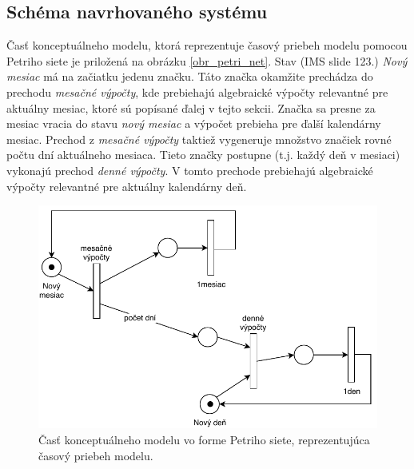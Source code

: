 \documentclass[a4paper, 11pt]{article}
\begin{document}
\subsection{Schéma navrhovaného systému} \label{petri_net_section}
Časť konceptuálneho modelu, ktorá reprezentuje časový priebeh modelu pomocou Petriho siete je priložená na obrázku \ref{obr_petri_net}. Stav (IMS\cite{ims_slides} slide 123.) \textit{Nový mesiac} má na začiatku jedenu značku. Táto značka okamžite prechádza do prechodu \textit{mesačné výpočty}, kde prebiehajú algebraické výpočty relevantné pre aktuálny mesiac, ktoré sú popísané ďalej v tejto sekcii. Značka sa presne za mesiac vracia do stavu \textit{nový mesiac} a výpočet prebieha pre ďalší kalendárny mesiac. Prechod z \textit{mesačné výpočty} taktiež vygeneruje množstvo značiek rovné počtu dní aktuálneho mesiaca. Tieto značky postupne (t.j. každý deň v mesiaci) vykonajú prechod \textit{denné výpočty}. V tomto prechode prebiehajú algebraické výpočty relevantné pre aktuálny kalendárny deň.

\begin{figure}[H] 
	\centering
	\includegraphics[width=.6\paperwidth]{images/petri_net.pdf}
	\caption{Časť konceptuálneho modelu vo forme Petriho siete, reprezentujúca časový priebeh modelu.}
\end{figure} \label{obr_petri_net}
\end{document}

